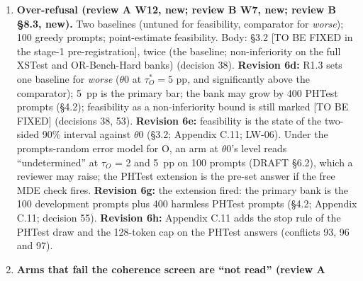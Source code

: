 \documentclass{article}
\theoremstyle{plain}
\theoremstyle{definition}
\theoremstyle{remark}
\begin{document}
\begin{enumerate}
        near-circular. The sources answer this only for a He-style plant (R8.5),
        and \S{}6 does not state it. \textbf{Revision 6g (the lead's ruling 4;
        addendum \S{}8 item 1): answered by a planned sensitivity.} Appendix C.5
        says that the plant's prompts are disjoint from the anchors', and that
        the planted sweep also reports A1's planted-cell rank under a
        disjoint-source anchor set (64 harmful and 64 safe anchors, not
        PKU-Alignment data, built by Gate C's anchor rule, its source sealed
        before the stage-1 freeze and before any planted run); the rank under
        the PKU-SafeRLHF anchors stays the counted one, marked [PLANNED; the
        stage-1 pre-registration is not yet frozen]. \S{}6 does not state the
        shared source (no room; decision 56). \textbf{Revision 6h (the lead's
        ruling 2):} \S{}6 now states the shared source and names the
        disjoint-anchor rank as the planned check (Appendix C.5; decision 56).
  \item \textbf{Over-refusal (review A W12, new; review B W7, new; review B
        \S{}8.3, new).} Two baselines (untuned for feasibility, comparator for
        \emph{worse}); 100 greedy prompts; point-estimate feasibility. Body:
        \S{}3.2 [TO BE FIXED in the stage-1 pre-registration], twice (the
        baseline; non-inferiority on the full XSTest and OR-Bench-Hard banks)
        (decision 38). \textbf{Revision 6d:} R1.3 sets one baseline for
        \emph{worse} ($\theta$0 at $\tau_O^* = 5$ pp, and significantly above
        the comparator); 5~pp is the primary bar; the bank may grow by 400
        PHTest prompts (\S{}4.2); feasibility as a non-inferiority bound is
        still marked [TO BE FIXED] (decisions 38, 53). \textbf{Revision 6e:}
        feasibility is the state of the two-sided 90\% interval against
        $\theta$0 (\S{}3.2; Appendix C.11; LW-06). Under the prompts-random
        error model for O, an arm at $\theta$0's level reads ``undetermined'' at
        $\tau_{O}$ = 2 and 5~pp on 100 prompts (DRAFT \S{}6.2), which a reviewer
        may raise; the PHTest extension is the pre-set answer if the free MDE
        check fires. \textbf{Revision 6g:} the extension fired: the primary bank
        is the 100 development prompts plus 400 harmless PHTest prompts
        (\S{}4.2; Appendix C.11; decision 55). \textbf{Revision 6h:} Appendix
        C.11 adds the stop rule of the PHTest draw and the 128-token cap on the
        PHTest answers (conflicts 93, 96 and 97).
  \item \textbf{Arms that fail the coherence screen are ``not read'' (review A
}
\end{enumerate}
\end{document}
